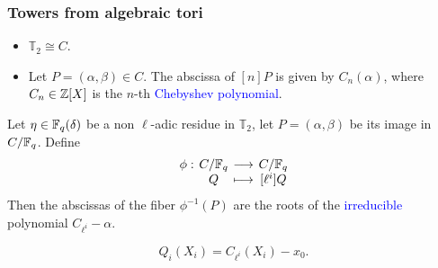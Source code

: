 \documentclass[10pt]{beamer}
\begin{document}
\begin{frame}
	\frametitle{Towers from algebraic tori}
	
	\begin{lemma}
		\begin{itemize}
			\item $\mathbb{T}_2 \cong C$.
			\item Let $P=(\alpha,\beta) \in C$. The abscissa of $[n]P$ is given by $C_n(\alpha)$, where $C_n\in\mathbb{Z}[X]$ is the $n$-th \textcolor{blue}{Chebyshev polynomial}.
		\end{itemize}
	\end{lemma}
	
	\begin{theorem}
		\label{th:T2-irred}
		Let $\eta\in\mathbb{F}_q(\delta)$ be a non $\ell$-adic residue in $\mathbb{T}_2$,
		let $P=(\alpha,\beta)$ be its image in $C/\mathbb{F}_q$. Define
		\[
		\setlength{\arraycolsep}{2pt}
		\begin{array}{cccc}
			\phi: & C/\F_q & \longrightarrow & C/\F_q \\
			& Q & \longmapsto & [\ell^i]Q
		\end{array}
		\]
		Then the abscissas of the fiber $\phi^{-1}(P)$ are the roots of the \textcolor{blue}{irreducible} polynomial $C_{\ell^i}-\alpha$.
	\end{theorem}

	\begin{corollary}
		\begin{equation*}
			Q_i(X_i) = C_{\ell^i}(X_i) - x_0.
		\end{equation*}
	\end{corollary}
\end{frame}

\end{document}
